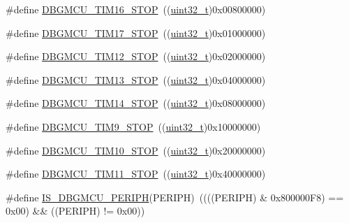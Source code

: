 \begin{DoxyCompactItemize}
\item 
\#define \hyperlink{group___d_b_g_m_c_u___exported___constants_ga8a0698403a9c76115bc607ee0149193f}{D\+B\+G\+M\+C\+U\+\_\+\+T\+I\+M16\+\_\+\+S\+T\+OP}~((\hyperlink{_p_e___types_8h_a33594304e786b158f3fb30289278f5af}{uint32\+\_\+t})0x00800000)
\item 
\#define \hyperlink{group___d_b_g_m_c_u___exported___constants_gabf3a93a60431c892bdf36ff02081badc}{D\+B\+G\+M\+C\+U\+\_\+\+T\+I\+M17\+\_\+\+S\+T\+OP}~((\hyperlink{_p_e___types_8h_a33594304e786b158f3fb30289278f5af}{uint32\+\_\+t})0x01000000)
\item 
\#define \hyperlink{group___d_b_g_m_c_u___exported___constants_ga4814287cef24f57e795b0f5b0174b49c}{D\+B\+G\+M\+C\+U\+\_\+\+T\+I\+M12\+\_\+\+S\+T\+OP}~((\hyperlink{_p_e___types_8h_a33594304e786b158f3fb30289278f5af}{uint32\+\_\+t})0x02000000)
\item 
\#define \hyperlink{group___d_b_g_m_c_u___exported___constants_gae0dd8a28977b261b013fa1ecda79b289}{D\+B\+G\+M\+C\+U\+\_\+\+T\+I\+M13\+\_\+\+S\+T\+OP}~((\hyperlink{_p_e___types_8h_a33594304e786b158f3fb30289278f5af}{uint32\+\_\+t})0x04000000)
\item 
\#define \hyperlink{group___d_b_g_m_c_u___exported___constants_ga731f63d66045abee68dbc634070df051}{D\+B\+G\+M\+C\+U\+\_\+\+T\+I\+M14\+\_\+\+S\+T\+OP}~((\hyperlink{_p_e___types_8h_a33594304e786b158f3fb30289278f5af}{uint32\+\_\+t})0x08000000)
\item 
\#define \hyperlink{group___d_b_g_m_c_u___exported___constants_ga560c557a0d0839dba04f7f2b47851109}{D\+B\+G\+M\+C\+U\+\_\+\+T\+I\+M9\+\_\+\+S\+T\+OP}~((\hyperlink{_p_e___types_8h_a33594304e786b158f3fb30289278f5af}{uint32\+\_\+t})0x10000000)
\item 
\#define \hyperlink{group___d_b_g_m_c_u___exported___constants_ga1f0ae2f78e1f9d7eb819bf49b13b5327}{D\+B\+G\+M\+C\+U\+\_\+\+T\+I\+M10\+\_\+\+S\+T\+OP}~((\hyperlink{_p_e___types_8h_a33594304e786b158f3fb30289278f5af}{uint32\+\_\+t})0x20000000)
\item 
\#define \hyperlink{group___d_b_g_m_c_u___exported___constants_gade03e5368c3bf8a2f43fc046f1d87f30}{D\+B\+G\+M\+C\+U\+\_\+\+T\+I\+M11\+\_\+\+S\+T\+OP}~((\hyperlink{_p_e___types_8h_a33594304e786b158f3fb30289278f5af}{uint32\+\_\+t})0x40000000)
\item 
\#define \hyperlink{group___d_b_g_m_c_u___exported___constants_ga96d44dc7861b6a3f364942704f323a45}{I\+S\+\_\+\+D\+B\+G\+M\+C\+U\+\_\+\+P\+E\+R\+I\+PH}(P\+E\+R\+I\+PH)~((((P\+E\+R\+I\+PH) \& 0x800000\+F8) == 0x00) \&\& ((\+P\+E\+R\+I\+P\+H) != 0x00))
\end{DoxyCompactItemize}
